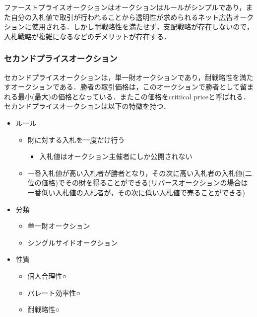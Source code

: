 ファーストプライスオークションはオークションはルールがシンプルであり，また自分の入札値で取引が行われることから透明性が求められるネット広告オークションに使用される\cite{google}．しかし耐戦略性を満たせず，支配戦略が存在しないので，入札戦略が複雑になるなどのデメリットが存在する．

\hypertarget{ux30bbux30abux30f3ux30c9ux30d7ux30e9ux30a4ux30b9ux30aaux30fcux30afux30b7ux30e7ux30f3}{%
\subsubsection{セカンドプライスオークション}\label{ux30bbux30abux30f3ux30c9ux30d7ux30e9ux30a4ux30b9ux30aaux30fcux30afux30b7ux30e7ux30f3}}

セカンドプライスオークションは，単一財オークションであり，耐戦略性を満たすオークションである．勝者の取引価格は，このオークションで勝者として留まれる最小(最大)の価格となっている．またこの価格をcritiical
priceと呼ばれる．セカンドプライスオークションは以下の特徴を持つ．

\begin{itemize}
\tightlist
\item
  ルール

  \begin{itemize}
  \tightlist
  \item
    財に対する入札を一度だけ行う

    \begin{itemize}
    \tightlist
    \item
      入札値はオークション主催者にしか公開されない
    \end{itemize}
  \item
    一番入札値が高い入札者が勝者となり，その次に高い入札者の入札値(二位の価格)でその財を得ることができる(リバースオークションの場合は一番低い入札値の入札者が，その次に低い入札値で売ることができる)
  \end{itemize}
\item
  分類

  \begin{itemize}
  \tightlist
  \item
    単一財オークション
  \item
    シングルサイドオークション
  \end{itemize}
\item
  性質

  \begin{itemize}
  \tightlist
  \item
    個人合理性○
  \item
    パレート効率性○
  \item
    耐戦略性○
  \end{itemize}
\end{itemize}

